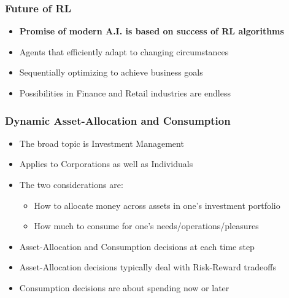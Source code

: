 \documentclass[handout]{beamer}
\begin{document}
\begin{frame}
\frametitle{Future of RL}
\pause
\begin{itemize}[<+->]

\item {\bf Promise of modern A.I. is based on success of RL algorithms}
\item Agents that efficiently adapt to changing circumstances
\item Sequentially optimizing to achieve business goals
\item Possibilities in Finance and Retail industries are endless 
\end{itemize}
\end{frame}


\begin{frame}
\frametitle{Dynamic Asset-Allocation and Consumption}
\pause
\begin{itemize}[<+->]
\item The broad topic is Investment Management
\item Applies to Corporations as well as Individuals
\item The two considerations are:
\pause
\begin{itemize}[<+->]
\item How to allocate money across assets in one's investment portfolio
\item How much to consume for one's needs/operations/pleasures
\end{itemize}
\item Asset-Allocation and Consumption decisions at each time step
\item Asset-Allocation decisions typically deal with Risk-Reward tradeoffs
\item Consumption decisions are about spending now or later
\end{itemize}
\end{frame}
\end{document}
